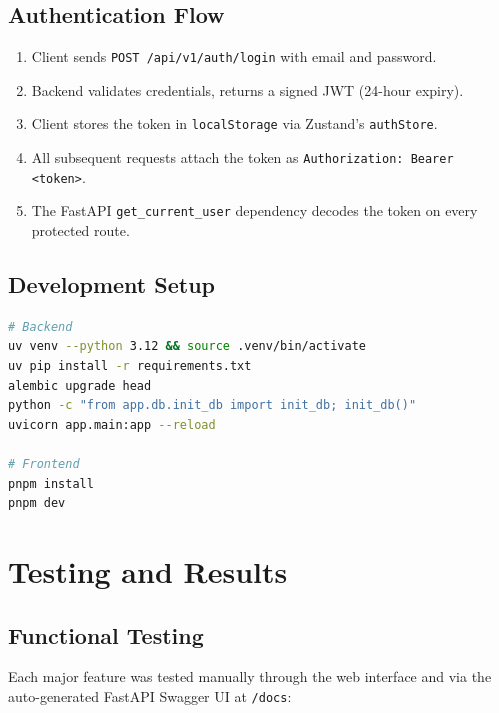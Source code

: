 \documentclass[12pt,a4paper]{article}
\begin{document}
\subsection{Authentication Flow}

\begin{enumerate}[noitemsep]
  \item Client sends \texttt{POST /api/v1/auth/login} with email and password.
  \item Backend validates credentials, returns a signed JWT (24-hour expiry).
  \item Client stores the token in \texttt{localStorage} via Zustand's \texttt{authStore}.
  \item All subsequent requests attach the token as \texttt{Authorization: Bearer <token>}.
  \item The FastAPI \texttt{get\_current\_user} dependency decodes the token on every protected route.
\end{enumerate}

\subsection{Development Setup}

\begin{lstlisting}[language=bash, caption={Environment setup commands}]
# Backend
uv venv --python 3.12 && source .venv/bin/activate
uv pip install -r requirements.txt
alembic upgrade head
python -c "from app.db.init_db import init_db; init_db()"
uvicorn app.main:app --reload

# Frontend
pnpm install
pnpm dev
\end{lstlisting}

\section{Testing and Results}

\subsection{Functional Testing}

Each major feature was tested manually through the web interface and via the auto-generated FastAPI Swagger UI at \texttt{/docs}:
\end{document}
